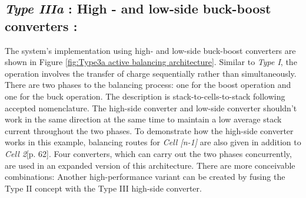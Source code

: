 \subsection{\textit{Type IIIa} :  High - and low-side buck-boost converters :}
The system's implementation using high- and low-side buck-boost converters are shown in Figure \ref{fig:Type3a active balancing architecture}. Similar to \textit{Type I}, the operation involves the transfer of charge sequentially rather than simultaneously. There are two phases to the balancing process: one for the boost operation and one for the buck operation. The description is stack-to-cells-to-stack following accepted nomenclature. The high-side converter and low-side converter shouldn't work in the same direction at the same time to maintain a low average stack current throughout the two phases. To demonstrate how the high-side converter works in this example, balancing routes for \textit{Cell [n-1]} are also given in addition to \textit{Cell 2}\cite{Active_Balancing_Thesis_Raber}[p. 62].
Four converters, which can carry out the two phases concurrently, are used in an expanded version of this architecture\cite{Active_Balancing_Thesis_Raber}. There are more conceivable combinations: Another high-performance variant can be created by fusing the Type II concept with the Type III high-side converter.\\

